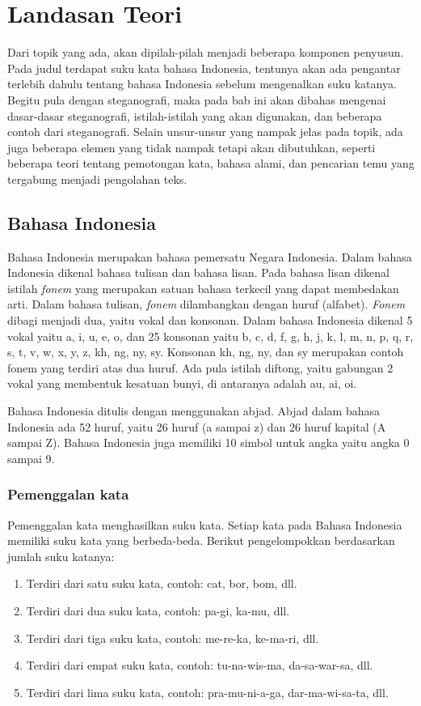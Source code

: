 \chapter{Landasan Teori}
\label{chap:landasan_teori}

Dari topik yang ada, akan dipilah-pilah menjadi beberapa komponen penyusun. Pada judul terdapat suku kata bahasa Indonesia, tentunya akan ada pengantar terlebih dahulu tentang bahasa Indonesia sebelum mengenalkan suku katanya. Begitu pula dengan steganografi, maka pada bab ini akan dibahas mengenai dasar-dasar steganografi, istilah-istilah yang akan digunakan, dan beberapa contoh dari steganografi. Selain unsur-unsur yang nampak jelas pada topik, ada juga beberapa elemen yang tidak nampak tetapi akan dibutuhkan, seperti beberapa teori tentang pemotongan kata, bahasa alami, dan pencarian temu yang tergabung menjadi pengolahan teks.

\section{Bahasa Indonesia \cite{eyd:2009}}
Bahasa Indonesia merupakan bahasa pemersatu Negara Indonesia. Dalam bahasa Indonesia dikenal bahasa tulisan dan bahasa lisan. Pada bahasa lisan dikenal istilah \textit{fonem} yang merupakan satuan bahasa terkecil yang dapat membedakan arti. Dalam bahasa tulisan, \textit{fonem} dilambangkan dengan huruf (alfabet). \textit{Fonem} dibagi menjadi dua, yaitu vokal dan konsonan. Dalam bahasa Indonesia dikenal 5 vokal yaitu a, i, u, e, o, dan 25 konsonan yaitu b, c, d, f, g, h, j, k, l, m, n, p, q, r, s, t, v, w, x, y, z, kh, ng, ny, sy. Konsonan kh, ng, ny, dan sy merupakan contoh fonem yang terdiri atas dua huruf. Ada pula istilah diftong, yaitu gabungan 2 vokal yang membentuk kesatuan bunyi, di antaranya adalah au, ai, oi.

Bahasa Indonesia ditulis dengan menggunakan abjad. Abjad dalam bahasa Indonesia ada 52 huruf, yaitu 26 huruf (a sampai z) dan 26 huruf kapital (A sampai Z). Bahasa Indonesia juga memiliki 10 simbol untuk angka yaitu angka 0 sampai 9.

\subsection{Pemenggalan kata}
Pemenggalan kata menghasilkan suku kata. Setiap kata pada Bahasa Indonesia memiliki suku kata yang berbeda-beda. 
Berikut pengelompokkan berdasarkan jumlah suku katanya:

\begin{enumerate}
	\item Terdiri dari satu suku kata, contoh: cat, bor, bom, dll.
	\item Terdiri dari dua suku kata, contoh: pa-gi, ka-mu, dll.
	\item Terdiri dari tiga suku kata, contoh: me-re-ka, ke-ma-ri, dll.
	\item Terdiri dari empat suku kata, contoh: tu-na-wis-ma, da-sa-war-sa, dll.
	\item Terdiri dari lima suku kata, contoh: pra-mu-ni-a-ga, dar-ma-wi-sa-ta, dll.
\end{enumerate}

